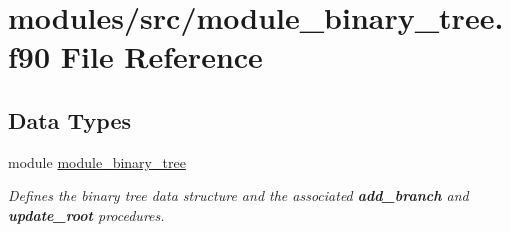 \hypertarget{module__binary__tree_8f90}{
\section{modules/src/module\-\_\-binary\-\_\-tree.f90 \-File \-Reference}
\label{module__binary__tree_8f90}
}
\subsection*{\-Data \-Types}
\begin{DoxyCompactItemize}
\item 
module \hyperlink{classmodule__binary__tree}{module\-\_\-binary\-\_\-tree}
\begin{DoxyCompactList}\small\item\em \-Defines the binary tree data structure and the associated {\bfseries add\-\_\-branch} and {\bfseries update\-\_\-root} procedures. \end{DoxyCompactList}\end{DoxyCompactItemize}
